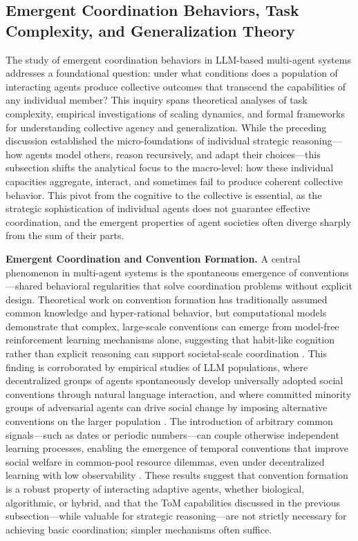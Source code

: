 \documentclass[11pt]{article}
\begin{document}
\subsection{Emergent Coordination Behaviors, Task Complexity, and Generalization Theory}

The study of emergent coordination behaviors in LLM-based multi-agent systems addresses a foundational question: under what conditions does a population of interacting agents produce collective outcomes that transcend the capabilities of any individual member? This inquiry spans theoretical analyses of task complexity, empirical investigations of scaling dynamics, and formal frameworks for understanding collective agency and generalization. While the preceding discussion established the micro-foundations of individual strategic reasoning---how agents model others, reason recursively, and adapt their choices---this subsection shifts the analytical focus to the macro-level: how these individual capacities aggregate, interact, and sometimes fail to produce coherent collective behavior. This pivot from the cognitive to the collective is essential, as the strategic sophistication of individual agents does not guarantee effective coordination, and the emergent properties of agent societies often diverge sharply from the sum of their parts.

\textbf{Emergent Coordination and Convention Formation.} A central phenomenon in multi-agent systems is the spontaneous emergence of conventions---shared behavioral regularities that solve coordination problems without explicit design. Theoretical work on convention formation has traditionally assumed common knowledge and hyper-rational behavior, but computational models demonstrate that complex, large-scale conventions can emerge from model-free reinforcement learning mechanisms alone, suggesting that habit-like cognition rather than explicit reasoning can support societal-scale coordination \cite{ref245}. This finding is corroborated by empirical studies of LLM populations, where decentralized groups of agents spontaneously develop universally adopted social conventions through natural language interaction, and where committed minority groups of adversarial agents can drive social change by imposing alternative conventions on the larger population \cite{ref246}. The introduction of arbitrary common signals---such as dates or periodic numbers---can couple otherwise independent learning processes, enabling the emergence of temporal conventions that improve social welfare in common-pool resource dilemmas, even under decentralized learning with low observability \cite{ref247}. These results suggest that convention formation is a robust property of interacting adaptive agents, whether biological, algorithmic, or hybrid, and that the ToM capabilities discussed in the previous subsection---while valuable for strategic reasoning---are not strictly necessary for achieving basic coordination; simpler mechanisms often suffice.
\end{document}
